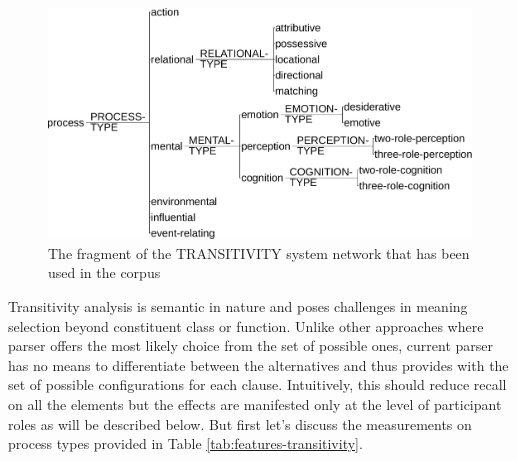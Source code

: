 \begin{figure}[!ht]
    \centering
    \includegraphics[width=.65\textwidth]{Figures/Evaluation/trans-simplified.pdf}
    \caption{The fragment of the TRANSITIVITY system network that has been used in the corpus}
    \label{fig:transitivity-simplified}
\end{figure}

Transitivity analysis is semantic in nature and poses challenges in meaning selection beyond constituent class or function. Unlike other approaches where parser offers the most likely choice from the set of possible ones, current parser has no means to differentiate between the alternatives and thus provides with the set of possible configurations for each clause. Intuitively, this should reduce recall on all the elements but the effects are manifested only at the level of participant roles as will be described below. But first let's discuss the measurements on process types provided in Table \ref{tab:features-transitivity}. 

